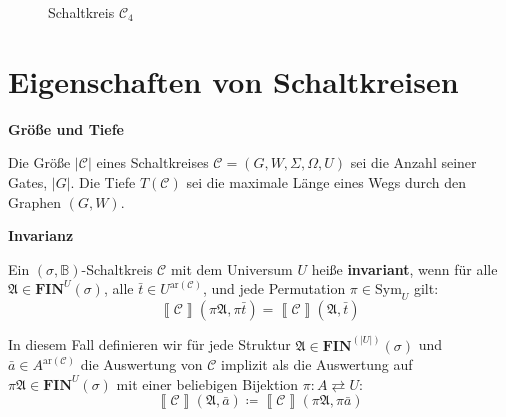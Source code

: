 \begin{example*}
\begin{figure}
\begin{centering}
\par\end{centering}
\caption{\label{fig:circuit}Schaltkreis $\mathcal{C}_{4}$}
\end{figure}
\end{example*}

\section{Eigenschaften von Schaltkreisen}
\begin{defn}
\textbf{Größe und Tiefe}

Die Größe $\left|\mathcal{C}\right|$ eines Schaltkreises $\mathcal{C}=\left(G,W,\Sigma,\Omega,U\right)$
sei die Anzahl seiner Gates, $\left|G\right|$. Die Tiefe $T\left(\mathcal{C}\right)$
sei die maximale Länge eines Wegs durch den Graphen $\left(G,W\right)$.
\end{defn}

\begin{defn}
\textbf{Invarianz}

Ein $\left(\sigma,\mathbb{B}\right)$-Schaltkreis $\mathcal{C}$ mit
dem Universum $U$ heiße \textbf{invariant}, wenn für alle $\mathfrak{A}\in\mathbf{FIN}^{U}\left(\sigma\right)$,
alle $\bar{t}\in U^{\mathrm{ar}\left(\mathcal{C}\right)}$, und jede
Permutation $\pi\in\mathrm{Sym}_{U}$ gilt:
\[
\left\llbracket \mathcal{C}\right\rrbracket \left(\pi\mathfrak{A},\pi\bar{t}\right)=\left\llbracket \mathcal{C}\right\rrbracket \left(\mathfrak{A},\bar{t}\right)
\]

In diesem Fall definieren wir für jede Struktur $\mathfrak{A}\in\mathbf{FIN}^{\left(\left|U\right|\right)}\left(\sigma\right)$
und $\bar{a}\in A^{\mathrm{ar}\left(\mathcal{C}\right)}$ die Auswertung
von $\mathcal{C}$ implizit als die Auswertung auf $\pi\mathfrak{A}\in\mathbf{FIN}^{U}\left(\sigma\right)$
mit einer beliebigen Bijektion $\pi:A\rightleftarrows U$:
\[
\left\llbracket \mathcal{C}\right\rrbracket \left(\mathfrak{A},\bar{a}\right)\coloneqq\left\llbracket \mathcal{C}\right\rrbracket \left(\pi\mathfrak{A},\pi\bar{a}\right)
\]
\end{defn}

